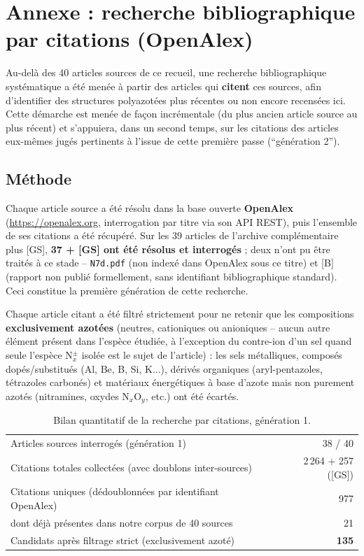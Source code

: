 \documentclass[11pt,a4paper]{article}
\begin{document}
\section{Annexe : recherche bibliographique par citations (OpenAlex)}
\label{sec:citation-search}

Au-del\`a des 40 articles sources de ce recueil, une recherche
bibliographique syst\'ematique a \'et\'e men\'ee \`a partir des articles
qui \textbf{citent} ces sources, afin d'identifier des structures
polyazot\'ees plus r\'ecentes ou non encore recens\'ees ici. Cette
d\'emarche est men\'ee de fa\c{c}on incr\'ementale (du plus ancien article
source au plus r\'ecent) et s'appuiera, dans un second temps, sur les
citations des articles eux-m\^emes jug\'es pertinents \`a l'issue de cette
premi\`ere passe (``g\'en\'eration 2'').

\subsection{M\'ethode}

Chaque article source a \'et\'e r\'esolu dans la base ouverte
\textbf{OpenAlex} (\url{https://openalex.org}, interrogation par titre via
son API REST), puis l'ensemble de ses citations a \'et\'e r\'ecup\'er\'e.
Sur les 39 articles de l'archive compl\'ementaire plus [GS], \textbf{37 +
[GS] ont \'et\'e r\'esolus et interrog\'es} ; deux n'ont pu \^etre trait\'es
\`a ce stade -- \texttt{N7d.pdf} (non index\'e dans OpenAlex sous ce
titre) et [B] (rapport non publi\'e formellement, sans identifiant
bibliographique standard). Ceci constitue la premi\`ere g\'en\'eration de
cette recherche.

Chaque article citant a \'et\'e filtr\'e strictement pour ne retenir que
les compositions \textbf{exclusivement azot\'ees} (neutres, cationiques ou
anioniques -- aucun autre \'el\'ement pr\'esent dans l'esp\`ece \'etudi\'ee,
\`a l'exception du contre-ion d'un sel quand seule l'esp\`ece N$_x^{\pm}$
isol\'ee est le sujet de l'article) : les sels m\'etalliques, compos\'es
dop\'es/substitu\'es (Al, Be, B, Si, K...), d\'eriv\'es organiques
(aryl-pentazoles, t\'etrazoles carbon\'es) et mat\'eriaux \'energ\'etiques
\`a base d'azote mais non purement azot\'es (nitramines, oxydes N$_x$O$_y$,
etc.) ont \'et\'e \'ecart\'es.

\begin{table}[H]
\centering
\begin{tabular}{lr}
\toprule
Articles sources interrog\'es (g\'en\'eration 1) & 38 / 40 \\
Citations totales collect\'ees (avec doublons inter-sources) & 2\,264 + 257 ([GS]) \\
Citations uniques (d\'edoublonn\'ees par identifiant OpenAlex) & 977 \\
\quad dont d\'ej\`a pr\'esentes dans notre corpus de 40 sources & 21 \\
Candidats apr\`es filtrage strict (exclusivement azot\'e) & \textbf{135} \\
\bottomrule
\end{tabular}
\caption{Bilan quantitatif de la recherche par citations, g\'en\'eration 1.}
\label{tab:citation-search-stats}
\end{table}
\end{document}
